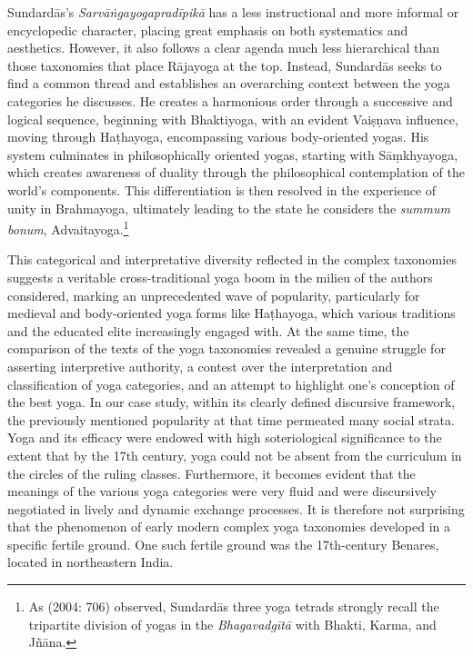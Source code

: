 Sundardās's \textit{Sarvāṅgayogapradīpikā} has a less instructional and more informal or encyclopedic character, placing great emphasis on both systematics and aesthetics. However, it also follows a clear agenda much less hierarchical than those taxonomies that place Rājayoga at the top. Instead, Sundardās seeks to find a common thread and establishes an overarching context between the yoga categories he discusses. He creates a harmonious order through a successive and logical sequence, beginning with Bhaktiyoga, with an evident Vaiṣṇava influence, moving through Haṭhayoga, encompassing various body-oriented yogas. His system culminates in philosophically oriented yogas, starting with Sāṃkhyayoga, which creates awareness of duality through the philosophical contemplation of the world's components. This differentiation is then resolved in the experience of unity in Brahmayoga, ultimately leading to the state he considers the \textit{summum bonum}, Advaitayoga.\footnote{As \citeauthor{burger2014sarvangayogapradipika} (2004: 706) observed, Sundardās three yoga tetrads strongly recall the tripartite division of yogas in the \emph{Bhagavadgītā} with Bhakti, Karma, and Jñāna.}

This categorical and interpretative diversity reflected in the complex taxonomies suggests a veritable cross-traditional yoga boom in the milieu of the authors considered, marking an unprecedented wave of popularity, particularly for medieval and body-oriented yoga forms like Haṭhayoga, which various traditions and the educated elite increasingly engaged with. At the same time, the comparison of the texts of the yoga taxonomies revealed a genuine struggle for asserting interpretive authority, a contest over the interpretation and classification of yoga categories, and an attempt to highlight one's conception of the best yoga.
In our case study, within its clearly defined discursive framework, the previously mentioned popularity at that time permeated many social strata. Yoga and its efficacy were endowed with high soteriological significance to the extent that by the 17th century, yoga could not be absent from the curriculum in the circles of the ruling classes. Furthermore, it becomes evident that the meanings of the various yoga categories were very fluid and were discursively negotiated in lively and dynamic exchange processes. It is therefore not surprising that the phenomenon of early modern complex yoga taxonomies developed in a specific fertile ground. One such fertile ground was the 17th-century Benares, located in northeastern India.


